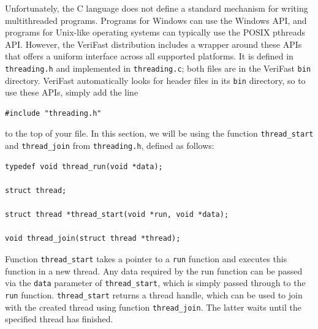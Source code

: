 \documentclass{article}
\begin{document}
Unfortunately, the C language does not define a standard
mechanism for writing multithreaded programs. Programs for
Windows can use the Windows API, and programs for Unix-like
operating systems can typically use the POSIX pthreads API.
However, the VeriFast distribution includes a wrapper around
these APIs that offers a uniform interface across all supported
platforms. It is defined in \texttt{threading.h} and
implemented in \texttt{threading.c}; both files are in the
VeriFast \texttt{bin} directory. VeriFast automatically looks
for header files in its \texttt{bin} directory, so to use these
APIs, simply add the line
\begin{lstlisting}
#include "threading.h"
\end{lstlisting}
to the top of your file. In this section, we will be using the
function \lstinline!thread_start! and \lstinline!thread_join!
from \texttt{threading.h}, defined as follows:
\begin{lstlisting}
typedef void thread_run(void *data);

struct thread;

struct thread *thread_start(void *run, void *data);

void thread_join(struct thread *thread);
\end{lstlisting}
Function \lstinline!thread_start! takes a pointer to a
\lstinline!run! function and executes this function in a new
thread. Any data required by the run function can be passed via
the \lstinline!data! parameter of \lstinline!thread_start!,
which is simply passed through to the \lstinline!run! function.
\lstinline!thread_start! returns a thread handle, which can be
used to join with the created thread using function
\lstinline!thread_join!. The latter waits until the specified
thread has finished.
\end{document}
